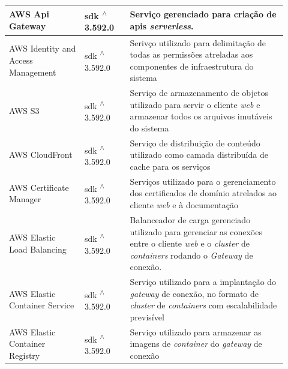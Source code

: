 \begin{longtable}{p{0.25\linewidth} p{0.15\linewidth} p{0.525\linewidth}}
\hline

AWS Api Gateway \citep{awsapigatewaydocs} & \gls{sdk} \textsuperscript{$\wedge$}3.592.0 & Serviço gerenciado para criação de \glspl{api} \textit{serverless}. \\

\hline

AWS Identity and Access Management \citep{awsiamdocs} & \gls{sdk} \textsuperscript{$\wedge$}3.592.0 & Serivço utilizado para delimitação de todas as permissões atreladas aos componentes de infraestrutura do sistema \\

\hline

AWS S3 \citep{awss3docs} & \gls{sdk} \textsuperscript{$\wedge$}3.592.0 & Serviço de armazenamento de objetos utilizado para servir o cliente \textit{web} e armazenar todos os arquivos imutáveis do sistema \\

\hline

AWS CloudFront \citep{awscloudfrontdocs} & \gls{sdk} \textsuperscript{$\wedge$}3.592.0 & Serviço de distribuição de conteúdo utilizado como camada distribuída de cache para os serviços \\

\hline

AWS Certificate Manager \citep{awscertificatemanagerdocs} & \gls{sdk} \textsuperscript{$\wedge$}3.592.0 & Serviços utilizado para o gerenciamento dos certificados de domínio atrelados ao cliente \textit{web} e à documentação \\

\hline

AWS Elastic Load Balancing \citep{awselasticloadbalancing} & \gls{sdk} \textsuperscript{$\wedge$}3.592.0 & Balanceador de carga gerenciado utilizado para gerenciar as conexões entre o cliente \textit{web} e o \textit{cluster} de \textit{containers} rodando o \textit{Gateway} de conexão. \\

\hline

AWS Elastic Container Service \citep{awsecsdocs} & \gls{sdk} \textsuperscript{$\wedge$}3.592.0 & Serviço utilizado para a implantação do \textit{gateway} de conexão, no formato de \textit{cluster} de \textit{containers} com escalabilidade previsível \\

\hline

AWS Elastic Container Registry \citep{awsecrdocs} & \gls{sdk} \textsuperscript{$\wedge$}3.592.0 & Serviço utilizado para armazenar as imagens de \textit{container} do \textit{gateway} de conexão \\


\end{longtable}
